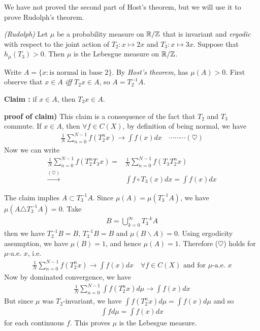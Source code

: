 \documentclass[12pt,a4paper]{report}
\newenvironment{proof}
{\begin{changemargin}{1cm}{0.5cm} 
	}%
	{\end{changemargin}
}
\newenvironment{subproof}
{\begin{changemargin}{0.5cm}{0.5cm}
	}%
	{\end{changemargin}
}
\begin{document}
\s

We have not proved the second part of Host's theorem, but we will use it to prove Rudolph's theorem.
\s

\thm \emph{(Rudolph)} Let $\mu$ be a probability measure on $\mathbb{R}/ \mathbb{Z}$ that is invariant and \emph{ergodic} with respect to the joint action of $T_2 : x \mapsto 2x$ and $T_3 : x\mapsto 3x$. Suppose that $h_{\mu}(T_3) >0$. Then $\mu$ is the Lebesgue measure on $\mathbb{R}/\mathbb{Z}$.
\begin{proof}
\pf Write $A = \{ x: \text{is normal in base 2}\}$. By \emph{Host's theorem}, has $\mu(A)>0$. First observe that $x\in A$ \emph{iff} $T_2 x \in A$, so $A = T_2^{-1} A$.
\s

\textbf{Claim :} if $x\in A$, then $T_3 x\in A$.
\begin{subproof}
\textbf{proof of claim)} This claim is a consequence of the fact that $T_2$ and $T_3$ commute. If $x\in A$, then $\forall f \in C(X)$, by definition of being normal, we have
\begin{align*}
\frac{1}{N} \sum_{n=0}^{N-1} f(T_2^n x) \rightarrow \int f(x)dx \quad \cdots\cdots\cdots (\heartsuit)
\end{align*}
Now we can write
\begin{align*}
\frac{1}{N} \sum_{n=0}^{N-1} f(T_2^n T_3 x) =& \frac{1}{N} \sum_{n=0}^{N-1} f(T_3 T_2^n x) \\
\xrightarrow{(\heartsuit)} & \int f \circ T_3 (x) dx = \int f(x)dx
\end{align*}
\end{subproof}
The claim implies $A \subset T_3^{-1} A$. Since $\mu(A) = \mu(T_3^{-1} A)$, we have $\mu(A \triangle T_3^{-1}A) =0$. Take
\begin{align*}
B = \bigcup_{k=0}^{\infty} T_3^{-k} A
\end{align*}
then we have $T_2^{-1}B= B$, $T_3^{-1} B = B$ and $\mu(B \backslash A) =0$. Using ergodicity assumption, we have $\mu(B) =1$, and hence $\mu(A)=1$. Therefore ($\heartsuit$) holds for $\mu$-a.e. $x$, i.e.
\begin{align*}
\frac{1}{N} \sum_{n=0}^{N-1} f(T^n_2 x) \rightarrow \int f(x) dx \quad \forall f\in C(X) \text{ and for } \mu \text{-a.e. }x
\end{align*}
Now by dominated convergence, we have
\begin{align*}
\frac{1}{N} \sum_{n=0}^{N-1} \int f(T_2^n x) d\mu \rightarrow \int f(x) dx
\end{align*}
But since $\mu$ was $T_2$-invariant, we have $\int f(T_2^n x)d\mu = \int f(x) d\mu$ and so 
\begin{align*}
\int f d\mu = \int f(x)dx
\end{align*}
for each continuous $f$. This proves $\mu$ is the Lebesgue measure.
\s

\eop
\end{proof}
\end{document}
